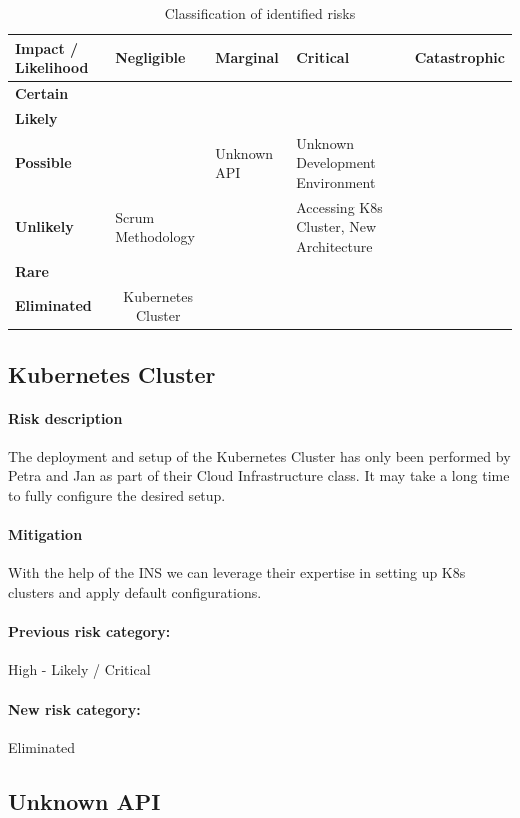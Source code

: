 \begin{table}
    \caption{Classification of identified risks}
    \label{tab:risk-classification}
    \begin{tabular*}{\textwidth}{ p{2.2cm} | p{2.3cm} | p{2cm} | p{3.5cm} | p{1cm} }
        \textbf{Impact / Likelihood} & \textbf{Negligible} & \textbf{Marginal} & \textbf{Critical} & \textbf{Catastrophic} \\ \hline
        \textbf{Certain}     & & & & \\ \hline
        \textbf{Likely}      & & & & \\ \hline
        \textbf{Possible}    & & Unknown API & Unknown Development Environment & \\ \hline
        \textbf{Unlikely}    & Scrum Methodology & & Accessing K8s Cluster, New Architecture & \\ \hline
        \textbf{Rare}        & & & & \\ \hline
        \textbf{Eliminated}  & \multicolumn{1}{c}{Kubernetes Cluster} \\
    \end{tabular*}
\end{table}

\subsection{Kubernetes Cluster}
\paragraph{Risk description} The deployment and setup of the Kubernetes Cluster has only been performed by Petra and Jan as part of their Cloud Infrastructure class. It may take a long time to fully configure the desired setup.
\paragraph{Mitigation} With the help of the INS we can leverage their expertise in setting up K8s clusters and apply default configurations.
\paragraph{Previous risk category:} High - Likely / Critical
\paragraph{New risk category:} Eliminated

\subsection{Unknown API}
